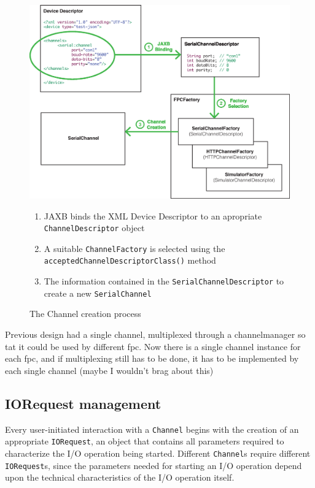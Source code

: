 \begin{figure}[h!]
\includegraphics[width=\textwidth]{imgs/channel_creation_process.eps}
\caption{The Channel creation process}
{
\begin{footnotesize}
\begin{enumerate}
  \item JAXB binds the XML Device Descriptor to an apropriate \texttt{ChannelDescriptor} object
  \item A suitable \texttt{ChannelFactory} is selected using the \texttt{acceptedChannelDescriptorClass()} method
  \item The information contained in the \texttt{SerialChannelDescriptor} to create a new \texttt{SerialChannel}
\end{enumerate}
\end{footnotesize}
}
\end{figure}


Previous design had a single channel, multiplexed through a channelmanager so tat it could be used by different fpc. Now there is a single channel instance for each fpc, and if multiplexing still has to be done, it has to be implemented by each single channel (maybe I wouldn't brag about this)


\subsection{IORequest management}

Every user-initiated interaction with a \texttt{Channel} begins with the creation of an appropriate \texttt{IORequest}, an object that contains all parameters required to characterize the I/O operation being started. Different \texttt{Channel}s require different \texttt{IORequest}s, since the parameters needed for starting an I/O operation depend upon the technical characteristics of the I/O operation itself.


